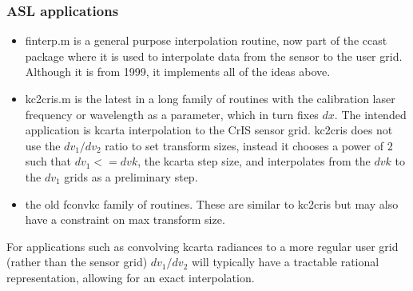 \begin{frame}
\frametitle{ASL applications}

\begin{itemize}
  \item finterp.m is a general purpose interpolation routine, now
    part of the ccast package where it is used to interpolate data
    from the sensor to the user grid.  Although it is from 1999, it
    implements all of the ideas above.
  \item kc2cris.m is the latest in a long family of routines with
    the calibration laser frequency or wavelength as a parameter,
    which in turn fixes $dx$.  The intended application is kcarta
    interpolation to the CrIS sensor grid.  kc2cris does not use the
    $dv_1 / dv_2$ ratio to set transform sizes, instead it chooses a
    power of 2 such that $dv_1 <= dvk$, the kcarta step size, and
    interpolates from the $dvk$ to the $dv_1$ grids as a preliminary
    step.
  \item the old fconvkc family of routines.  These are similar to
    kc2cris but may also have a constraint on max transform size.
\end{itemize}
    
For applications such as convolving kcarta radiances to a more
regular user grid (rather than the sensor grid) $dv_1 / dv_2$ will
typically have a tractable rational representation, allowing for 
an exact interpolation.

\end{frame}
